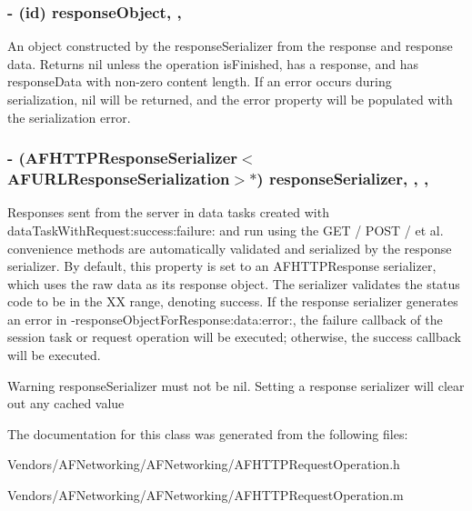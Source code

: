 \subsubsection[{response\+Object}]{\setlength{\rightskip}{0pt plus 5cm}-\/ (id) response\+Object\hspace{0.3cm}{\ttfamily [read]}, {\ttfamily [nonatomic]}, {\ttfamily [strong]}}\label{interface_a_f_h_t_t_p_request_operation_a7418f7784dcaf21623ce588fb27734c3}
An object constructed by the {\ttfamily response\+Serializer} from the response and response data. Returns {\ttfamily nil} unless the operation {\ttfamily is\+Finished}, has a {\ttfamily response}, and has {\ttfamily response\+Data} with non-\/zero content length. If an error occurs during serialization, {\ttfamily nil} will be returned, and the {\ttfamily error} property will be populated with the serialization error. \hypertarget{interface_a_f_h_t_t_p_request_operation_a1d59d01b3fff2796f06c35891dc01cea}{}
\subsubsection[{response\+Serializer}]{\setlength{\rightskip}{0pt plus 5cm}-\/ ({\bf A\+F\+H\+T\+T\+P\+Response\+Serializer}$<${\bf A\+F\+U\+R\+L\+Response\+Serialization}$>$$\ast$) response\+Serializer\hspace{0.3cm}{\ttfamily [read]}, {\ttfamily [write]}, {\ttfamily [nonatomic]}, {\ttfamily [strong]}}\label{interface_a_f_h_t_t_p_request_operation_a1d59d01b3fff2796f06c35891dc01cea}
Responses sent from the server in data tasks created with {\ttfamily data\+Task\+With\+Request\+:success\+:failure\+:} and run using the {\ttfamily G\+E\+T} / {\ttfamily P\+O\+S\+T} / et al. convenience methods are automatically validated and serialized by the response serializer. By default, this property is set to an A\+F\+H\+T\+T\+P\+Response serializer, which uses the raw data as its response object. The serializer validates the status code to be in the {\+X\+X} range, denoting success. If the response serializer generates an error in {\ttfamily -\/response\+Object\+For\+Response\+:data\+:error\+:}, the {\ttfamily failure} callback of the session task or request operation will be executed; otherwise, the {\ttfamily success} callback will be executed.

\begin{DoxyWarning}{Warning}
{\ttfamily response\+Serializer} must not be {\ttfamily nil}. Setting a response serializer will clear out any cached value 
\end{DoxyWarning}


The documentation for this class was generated from the following files\+:\begin{DoxyCompactItemize}
\item 
Vendors/\+A\+F\+Networking/\+A\+F\+Networking/A\+F\+H\+T\+T\+P\+Request\+Operation.\+h\item 
Vendors/\+A\+F\+Networking/\+A\+F\+Networking/A\+F\+H\+T\+T\+P\+Request\+Operation.\+m\end{DoxyCompactItemize}
